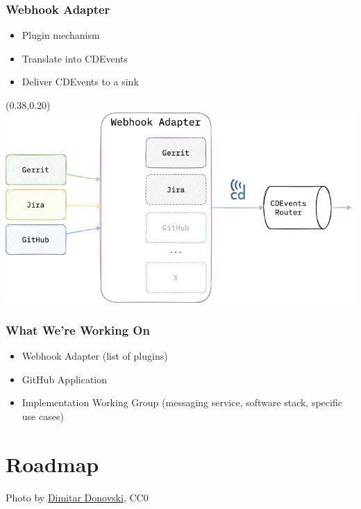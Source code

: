 \documentclass[aspectratio=169,11pt,hyperref={colorlinks=true}]{beamer}
\begin{document}

\begin{grayframe}
  \frametitle{Webhook Adapter}
  \begin{itemize}
    \item Plugin mechanism
    \item Translate into CDEvents
    \item Deliver CDEvents to a sink
  \end{itemize}
  \begin{textblock*}{0.60\paperwidth}(0.38\paperwidth,0.20\paperheight)
    \includegraphics[width=0.60\paperwidth]{img/cdevents-webhook_adapter.png}
  \end{textblock*}
\end{grayframe}

\begin{grayframe}
  \frametitle{What We're Working On}
  \begin{itemize}
    \item Webhook Adapter (list of plugins)
    \item GitHub Application
    \item Implementation Working Group (messaging service, software stack, specific use cases)
  \end{itemize}
\end{grayframe}

\section{Roadmap}
\begin{sectionwithpiclargecentral}{Photo by \href{https://unsplash.com/@dmtrdon}{\underline{Dimitar Donovski}}, CC0}
\end{sectionwithpiclargecentral}
\end{document}

